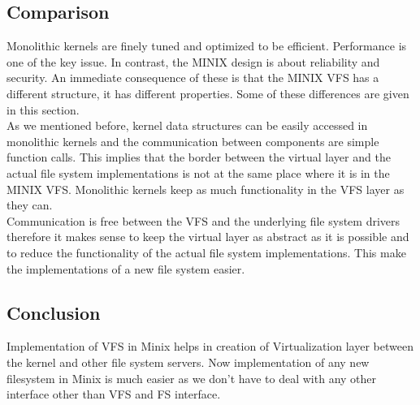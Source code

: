\subsection{Comparison}
Monolithic kernels are finely tuned and optimized to be efficient. Performance is one of the key issue. In contrast, the MINIX design is about reliability and security. An immediate consequence of these is that the MINIX VFS has a different structure, it has different properties. Some of these differences are given in this section.\\

As we mentioned before, kernel data structures can be easily accessed in monolithic kernels and the communication between components are simple function calls. This implies that the border between the virtual layer and the actual file system implementations is not at the same place where it is in the MINIX VFS. Monolithic kernels keep as much functionality in the VFS layer as they can.\\

Communication is free between the VFS and the underlying file system drivers therefore it makes sense to keep the virtual layer as abstract as it is possible and to reduce the functionality of the actual file system implementations. This make the implementations of a new file system easier. 

\subsection{Conclusion}

Implementation of VFS in Minix helps in creation of Virtualization layer between the kernel and other file system servers. Now implementation of any new filesystem in Minix is much easier as we don't have to deal with any other interface other than VFS and FS interface.
